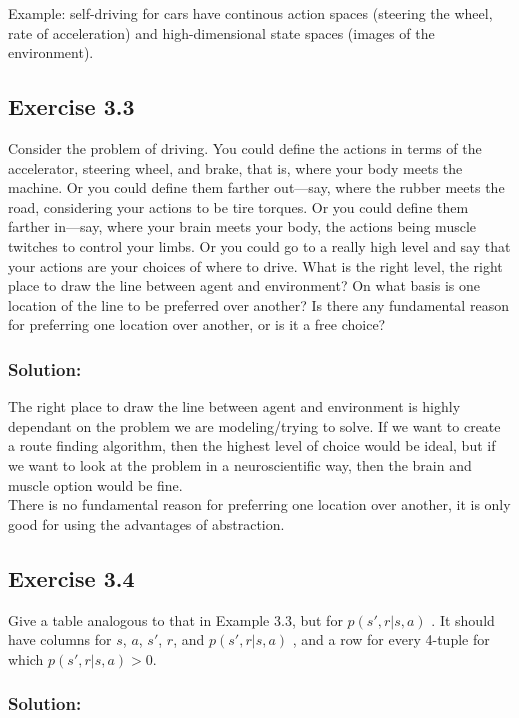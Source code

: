 Example: self-driving for cars have continous action spaces (steering the wheel, rate of acceleration) and high-dimensional state spaces (images of the environment).

\subsection*{Exercise 3.3}
Consider the problem of driving. You could define the actions in terms of
the accelerator, steering wheel, and brake, that is, where your body meets the machine.
Or you could define them farther out—say, where the rubber meets the road, considering
your actions to be tire torques. Or you could define them farther in—say, where your
brain meets your body, the actions being muscle twitches to control your limbs. Or you
could go to a really high level and say that your actions are your choices of where to drive.
What is the right level, the right place to draw the line between agent and environment?
On what basis is one location of the line to be preferred over another? Is there any
fundamental reason for preferring one location over another, or is it a free choice?

\subsubsection*{Solution:} 
The right place to draw the line between agent and environment is highly dependant on the problem we are modeling/trying to solve. If we want to create a route finding algorithm, then the highest level of choice would be ideal, but if we want to look at the problem in a neuroscientific way, then the brain and muscle option would be fine.\\
There is no fundamental reason for preferring one location over another, it is only good for using the advantages of abstraction.


\subsection*{Exercise 3.4}
Give a table analogous to that in Example 3.3, but for $p(s', r |s, a)$ . It
should have columns for $s$, $a$, $s'$, $r$, and $p(s', r |s, a)$ , and a row for every 4-tuple for which
$p(s', r |s, a)  > 0$.

\subsubsection*{Solution:}

